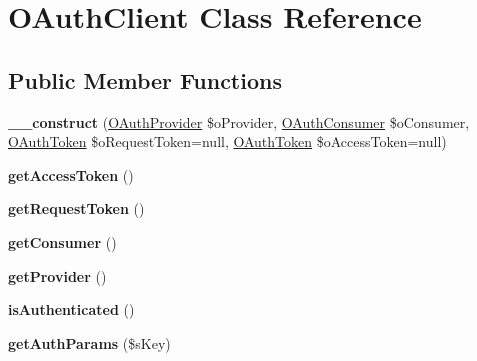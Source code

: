 \hypertarget{class_o_auth_client}{\section{O\-Auth\-Client Class Reference}
\label{class_o_auth_client}
}
\subsection*{Public Member Functions}
\begin{DoxyCompactItemize}
\item 
\hypertarget{class_o_auth_client_ab5d3040c22191ec6c9d2b009998e15c7}{{\bfseries \-\_\-\-\_\-construct} (\hyperlink{class_o_auth_provider}{O\-Auth\-Provider} \$o\-Provider, \hyperlink{class_o_auth_consumer}{O\-Auth\-Consumer} \$o\-Consumer, \hyperlink{class_o_auth_token}{O\-Auth\-Token} \$o\-Request\-Token=null, \hyperlink{class_o_auth_token}{O\-Auth\-Token} \$o\-Access\-Token=null)}\label{class_o_auth_client_ab5d3040c22191ec6c9d2b009998e15c7}

\item 
\hypertarget{class_o_auth_client_a03a84ff4f5b9f407cfcdfa34db0bb3eb}{{\bfseries get\-Access\-Token} ()}\label{class_o_auth_client_a03a84ff4f5b9f407cfcdfa34db0bb3eb}

\item 
\hypertarget{class_o_auth_client_aac63bbd444a06098a7b0d0776a110dd9}{{\bfseries get\-Request\-Token} ()}\label{class_o_auth_client_aac63bbd444a06098a7b0d0776a110dd9}

\item 
\hypertarget{class_o_auth_client_a748eceeba6866b3cc3ad36281d7ddfb8}{{\bfseries get\-Consumer} ()}\label{class_o_auth_client_a748eceeba6866b3cc3ad36281d7ddfb8}

\item 
\hypertarget{class_o_auth_client_aadd5d8f8950c87356c509b3592433030}{{\bfseries get\-Provider} ()}\label{class_o_auth_client_aadd5d8f8950c87356c509b3592433030}

\item 
\hypertarget{class_o_auth_client_a1aa6f2bbf0741ee402126e18bc707258}{{\bfseries is\-Authenticated} ()}\label{class_o_auth_client_a1aa6f2bbf0741ee402126e18bc707258}

\item 
\hypertarget{class_o_auth_client_a8edd3daa04fa00dc8b3a76f015596c49}{{\bfseries get\-Auth\-Params} (\$s\-Key)}\label{class_o_auth_client_a8edd3daa04fa00dc8b3a76f015596c49}


\end{DoxyCompactItemize}
